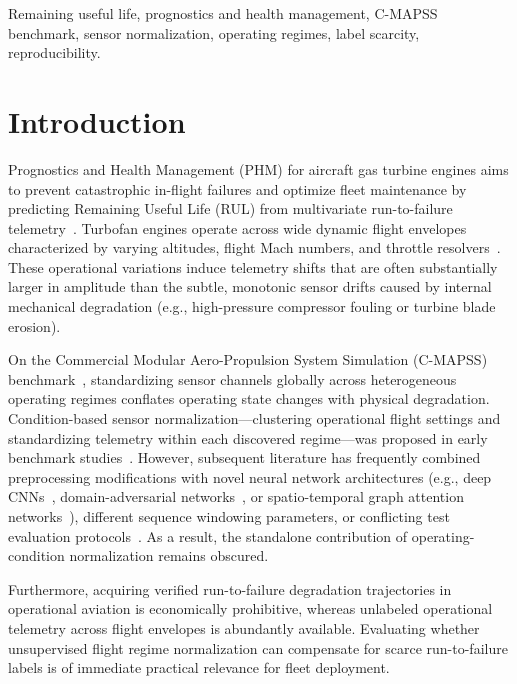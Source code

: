 \documentclass[conference]{IEEEtran}
\begin{document}
\begin{IEEEkeywords}
Remaining useful life, prognostics and health management, C-MAPSS benchmark, sensor normalization, operating regimes, label scarcity, reproducibility.
\end{IEEEkeywords}

\section{Introduction}
Prognostics and Health Management (PHM) for aircraft gas turbine engines aims to prevent catastrophic in-flight failures and optimize fleet maintenance by predicting Remaining Useful Life (RUL) from multivariate run-to-failure telemetry~\cite{saxena2008cmapss}. Turbofan engines operate across wide dynamic flight envelopes characterized by varying altitudes, flight Mach numbers, and throttle resolvers~\cite{frederick2007cmapss}. These operational variations induce telemetry shifts that are often substantially larger in amplitude than the subtle, monotonic sensor drifts caused by internal mechanical degradation (e.g., high-pressure compressor fouling or turbine blade erosion).

On the Commercial Modular Aero-Propulsion System Simulation (C-MAPSS) benchmark~\cite{saxena2008cmapss}, standardizing sensor channels globally across heterogeneous operating regimes conflates operating state changes with physical degradation. Condition-based sensor normalization—clustering operational flight settings and standardizing telemetry within each discovered regime—was proposed in early benchmark studies~\cite{pasa2019}. However, subsequent literature has frequently combined preprocessing modifications with novel neural network architectures (e.g., deep CNNs~\cite{li2018tcn}, domain-adversarial networks~\cite{da2021transfer, ragab2020adversarial}, or spatio-temporal graph attention networks~\cite{stagnn2024}), different sequence windowing parameters, or conflicting test evaluation protocols~\cite{ramasso2014investigating, gupta2024auditing}. As a result, the standalone contribution of operating-condition normalization remains obscured.

Furthermore, acquiring verified run-to-failure degradation trajectories in operational aviation is economically prohibitive, whereas unlabeled operational telemetry across flight envelopes is abundantly available. Evaluating whether unsupervised flight regime normalization can compensate for scarce run-to-failure labels is of immediate practical relevance for fleet deployment.
\end{document}
